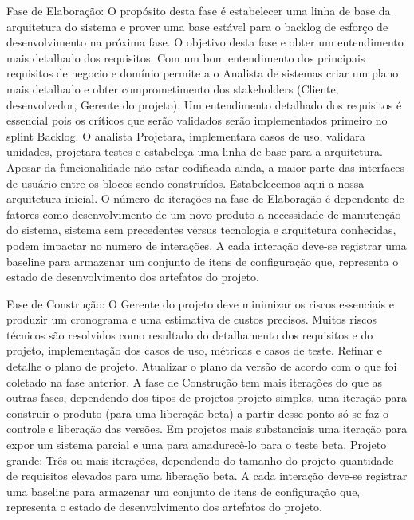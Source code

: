 \documentclass[	DIV=calc,%
							paper=a4,%
							fontsize=12pt,%
							onecolumn]{scrartcl}	 					%
\begin{document}
Fase de Elaboração: O propósito desta fase é estabelecer uma linha de base da arquitetura do sistema e prover uma base estável para o backlog de esforço de desenvolvimento na próxima fase.
O objetivo desta fase e obter um entendimento mais detalhado dos requisitos. Com um bom entendimento dos principais requisitos de negocio e domínio permite a o Analista de sistemas criar um plano mais detalhado e obter comprometimento dos stakeholders (Cliente, desenvolvedor, Gerente do projeto). Um entendimento detalhado dos requisitos é essencial pois os críticos que serão validados serão implementados primeiro no splint Backlog. O analista Projetara, implementara casos de uso, validara unidades, projetara testes e estabeleça uma linha de base para a arquitetura. Apesar da funcionalidade não estar codificada ainda, a maior parte das interfaces de usuário entre os blocos sendo construídos. Estabelecemos aqui a nossa arquitetura inicial.
O número de iterações na fase de Elaboração é dependente de fatores como desenvolvimento de um novo produto a necessidade de manutenção do sistema, sistema sem precedentes versus tecnologia e arquitetura conhecidas, podem impactar no numero de interações.  A cada interação deve-se registrar uma baseline para armazenar um conjunto de itens de configuração que, representa o estado de desenvolvimento dos artefatos do projeto.

Fase de Construção: O Gerente do projeto deve minimizar os riscos essenciais e produzir um cronograma e uma estimativa de custos precisos. Muitos riscos técnicos são resolvidos como resultado do detalhamento dos requisitos e do projeto, implementação dos casos de uso, métricas e casos de teste. Refinar e detalhe o plano de projeto. Atualizar o plano da versão de acordo com o que foi coletado na fase anterior.
A fase de Construção tem mais iterações do que as outras fases, dependendo dos tipos de projetos projeto simples, uma iteração para construir o produto (para uma liberação beta) a partir desse ponto só se faz o controle e liberação das versões. Em projetos mais substanciais uma iteração para expor um sistema parcial e uma para amadurecê-lo para o teste beta. Projeto grande: Três ou mais iterações, dependendo do tamanho do projeto quantidade de requisitos  elevados para uma liberação beta. A cada interação deve-se registrar uma baseline para armazenar um conjunto de itens de configuração que, representa o estado de desenvolvimento dos artefatos do projeto.
\end{document}
